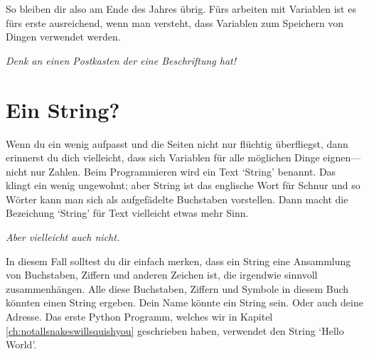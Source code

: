 So bleiben dir also  am Ende des Jahres übrig. Fürs arbeiten mit Variablen ist es fürs erste ausreichend, wenn man versteht, dass Variablen zum Speichern von Dingen verwendet werden.

\noindent
\emph{Denk an einen Postkasten der eine Beschriftung hat!}

\section{Ein String?}

Wenn du ein wenig aufpasst und die Seiten nicht nur flüchtig überfliegst, dann erinnerst du dich vielleicht, dass sich Variablen für alle möglichen Dinge eignen---nicht nur Zahlen. Beim Programmieren wird ein Text `String' benannt. Das klingt ein wenig ungewohnt; aber String ist das englische Wort für Schnur und so Wörter kann man sich als aufgefädelte Buchstaben vorstellen. Dann macht die Bezeichung `String' für Text vielleicht etwas mehr Sinn.

\noindent
\emph{Aber vielleicht auch nicht.}

In diesem Fall solltest du dir einfach merken, dass ein String eine Ansammlung von Buchstaben, Ziffern und anderen Zeichen ist, die irgendwie sinnvoll zusammenhängen. Alle diese Buchstaben, Ziffern und Symbole in diesem Buch könnten einen String ergeben. Dein Name könnte ein String sein. Oder auch deine Adresse. Das erste Python Programm, welches wir in Kapitel \ref{ch:notallsnakeswillsquishyou} geschrieben haben, verwendet den String `Hello World'.

